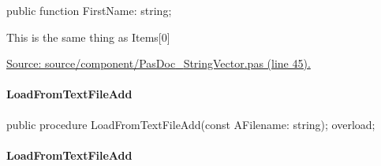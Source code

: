 \documentclass{report}
\newif\ifpdf
\begin{document}
\label{PasDoc_StringVector.TStringVector-FirstName}
\begin{list}{}{
\setlength{\itemindent}{0cm}
\setlength{\listparindent}{0cm}
\setlength{\leftmargin}{\evensidemargin}
\addtolength{\leftmargin}{\tmplength}
\settowidth{\labelsep}{X}
\addtolength{\leftmargin}{\labelsep}
\setlength{\labelwidth}{\tmplength}
}
\item[\textbf{Declaration}\hfill]
\ifpdf
\begin{flushleft}
\fi
\begin{ttfamily}
public function FirstName: string;\end{ttfamily}

\ifpdf
\end{flushleft}
\fi

\par
\item[\textbf{Description}]
This is the same thing as Items[0]\par
\href{https://github.com/pasdoc/pasdoc/blob/master/source/component/PasDoc_StringVector.pas#L45}{Source: source/component/PasDoc{\_}StringVector.pas (line 45).}

\end{list}
\paragraph*{LoadFromTextFileAdd}\hspace*{\fill}

\label{PasDoc_StringVector.TStringVector-LoadFromTextFileAdd}
\begin{list}{}{
\setlength{\itemindent}{0cm}
\setlength{\listparindent}{0cm}
\setlength{\leftmargin}{\evensidemargin}
\addtolength{\leftmargin}{\tmplength}
\settowidth{\labelsep}{X}
\addtolength{\leftmargin}{\labelsep}
\setlength{\labelwidth}{\tmplength}
}
\item[\textbf{Declaration}\hfill]
\ifpdf
\begin{flushleft}
\fi
\begin{ttfamily}
public procedure LoadFromTextFileAdd(const AFilename: string); overload;\end{ttfamily}

\ifpdf
\end{flushleft}
\fi

\end{list}
\paragraph*{LoadFromTextFileAdd}\hspace*{\fill}
\end{document}
